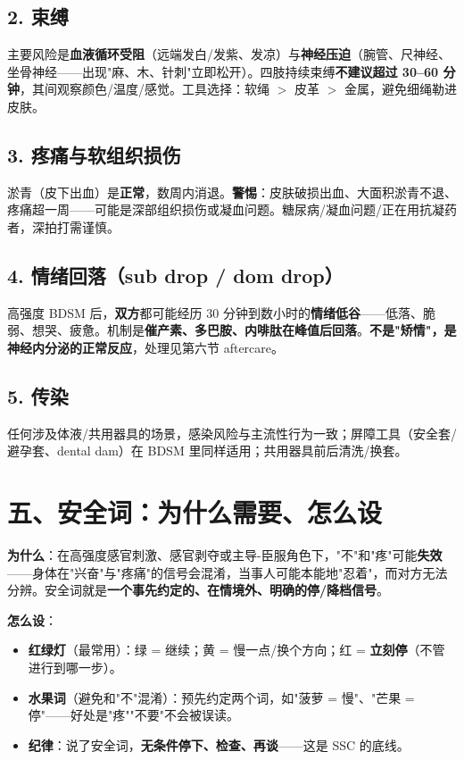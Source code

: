 \documentclass[12pt,UTF8,openany]{ctexbook}
\begin{document}
\subsection*{2. 束缚}
主要风险是\textbf{血液循环受阻}（远端发白/发紫、发凉）与\textbf{神经压迫}（腕管、尺神经、坐骨神经——出现"麻、木、针刺"立即松开）。四肢持续束缚\textbf{不建议超过 30--60 分钟}，其间观察颜色/温度/感觉。工具选择：软绳 $>$ 皮革 $>$ 金属，避免细绳勒进皮肤。

\subsection*{3. 疼痛与软组织损伤}
淤青（皮下出血）是\textbf{正常}，数周内消退。\textbf{警惕}：皮肤破损出血、大面积淤青不退、疼痛超一周——可能是深部组织损伤或凝血问题。糖尿病/凝血问题/正在用抗凝药者，深拍打需谨慎。

\subsection*{4. 情绪回落（sub drop / dom drop）}
高强度 BDSM 后，\textbf{双方}都可能经历 30 分钟到数小时的\textbf{情绪低谷}——低落、脆弱、想哭、疲惫。机制是\textbf{催产素、多巴胺、内啡肽在峰值后回落}。\textbf{不是"矫情"，是神经内分泌的正常反应}，处理见第六节 aftercare。

\subsection*{5. 传染}
任何涉及体液/共用器具的场景，感染风险与主流性行为一致；屏障工具（安全套/避孕套、dental dam）在 BDSM 里同样适用；共用器具前后清洗/换套。

\section{五、安全词：为什么需要、怎么设}

\textbf{为什么}：在高强度感官刺激、感官剥夺或主导-臣服角色下，"不"和"疼"可能\textbf{失效}——身体在"兴奋"与"疼痛"的信号会混淆，当事人可能本能地"忍着"，而对方无法分辨。安全词就是\textbf{一个事先约定的、在情境外、明确的停/降档信号}。

\textbf{怎么设}：
\begin{itemize}
  \item \textbf{红绿灯}（最常用）：\textcolor{mygreen}{绿} = 继续；\textcolor{myamber}{黄} = 慢一点/换个方向；\textcolor{myred}{红} = \textbf{立刻停}（不管进行到哪一步）。
  \item \textbf{水果词}（避免和"不"混淆）：预先约定两个词，如"菠萝 = 慢"、"芒果 = 停"——好处是"疼""不要"不会被误读。
  \item \textbf{纪律}：说了安全词，\textbf{无条件停下、检查、再谈}——这是 SSC 的底线。
\end{itemize}
\end{document}
